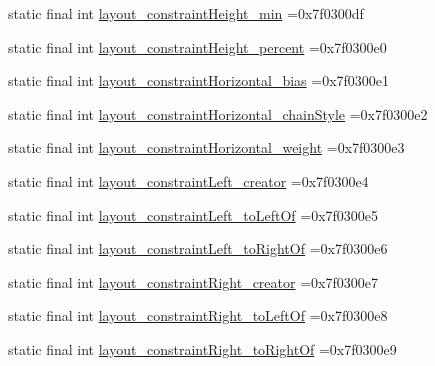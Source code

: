 \begin{DoxyCompactItemize}
\item 
static final int \mbox{\hyperlink{classcom_1_1example_1_1trainawearapplication_1_1_r_1_1attr_a2f26a120e3a1ea7b80c756f1e1378da8}{layout\+\_\+constraint\+Height\+\_\+min}} =0x7f0300df
\item 
static final int \mbox{\hyperlink{classcom_1_1example_1_1trainawearapplication_1_1_r_1_1attr_a2854bfe3476b81cc9688ef158d975ffa}{layout\+\_\+constraint\+Height\+\_\+percent}} =0x7f0300e0
\item 
static final int \mbox{\hyperlink{classcom_1_1example_1_1trainawearapplication_1_1_r_1_1attr_a5b14e0bbd100c7e318a76a06720bc510}{layout\+\_\+constraint\+Horizontal\+\_\+bias}} =0x7f0300e1
\item 
static final int \mbox{\hyperlink{classcom_1_1example_1_1trainawearapplication_1_1_r_1_1attr_a9500d34348159ed48e7f87b878c19ee0}{layout\+\_\+constraint\+Horizontal\+\_\+chain\+Style}} =0x7f0300e2
\item 
static final int \mbox{\hyperlink{classcom_1_1example_1_1trainawearapplication_1_1_r_1_1attr_ad44dc1d44775df85a66af2c6cdb8d800}{layout\+\_\+constraint\+Horizontal\+\_\+weight}} =0x7f0300e3
\item 
static final int \mbox{\hyperlink{classcom_1_1example_1_1trainawearapplication_1_1_r_1_1attr_aa8b57187c4090e8e86f5129ce279ff61}{layout\+\_\+constraint\+Left\+\_\+creator}} =0x7f0300e4
\item 
static final int \mbox{\hyperlink{classcom_1_1example_1_1trainawearapplication_1_1_r_1_1attr_a32b56b1a1b47120acbfe3856132294f4}{layout\+\_\+constraint\+Left\+\_\+to\+Left\+Of}} =0x7f0300e5
\item 
static final int \mbox{\hyperlink{classcom_1_1example_1_1trainawearapplication_1_1_r_1_1attr_aa1e57bb84da0b8a6fa479791d28162c5}{layout\+\_\+constraint\+Left\+\_\+to\+Right\+Of}} =0x7f0300e6
\item 
static final int \mbox{\hyperlink{classcom_1_1example_1_1trainawearapplication_1_1_r_1_1attr_ad8fe509ea3eec997049299cb20bae651}{layout\+\_\+constraint\+Right\+\_\+creator}} =0x7f0300e7
\item 
static final int \mbox{\hyperlink{classcom_1_1example_1_1trainawearapplication_1_1_r_1_1attr_a3b2b4e608a7c3d7c8ed4a5d034b5b91f}{layout\+\_\+constraint\+Right\+\_\+to\+Left\+Of}} =0x7f0300e8
\item 
static final int \mbox{\hyperlink{classcom_1_1example_1_1trainawearapplication_1_1_r_1_1attr_a22e180345beda1b0345b8ca0dd47d02e}{layout\+\_\+constraint\+Right\+\_\+to\+Right\+Of}} =0x7f0300e9
\item 

\end{DoxyCompactItemize}
